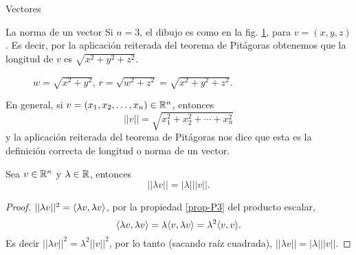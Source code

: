\begin{chapter}{Vectores}
\begin{section}{La norma de un vector}
    Si $n=3$,  el dibujo es como en la fig. \ref{fig-pitagoras-3d}, para $v =(x,y,z)$.  Es decir,  por la aplicación reiterada del teorema de Pitágoras obtenemos que la longitud de $v$ es $\sqrt{x^2 + y^2 +z^2}$.
    \begin{figure}[h]
    	\centering
        \caption{$w= \sqrt{x^2 + y^2}$, $r = \sqrt{w^2 + z^2} = \sqrt{x^2 + y^2 +z^2}$.}
        \label{fig-pitagoras-3d}
    \end{figure} 
    
    En  general,  si $v =(x_1,x_2,\ldots,x_n) \in \mathbb R^n$,  entonces
    \begin{equation*}
        ||v|| = \sqrt{x_1^2+x_2^2+\cdots+x_n^2}
    \end{equation*} 
    y la aplicación reiterada del  teorema de Pitágoras nos dice que esta es la definición correcta de longitud o norma de un vector. 
    
    \begin{proposicion}\label{prop-lambda-norma}
        Sea $v \in \mathbb R^n$ y $\lambda \in \mathbb R$,  entonces
        \begin{equation*}
            ||\lambda v|| = |\lambda|||v||.
        \end{equation*}
    \end{proposicion}
    \begin{proof}
        $||\lambda v||^2 = \langle\lambda v, \lambda v \rangle$, por la propiedad \ref{prop-P3} del producto escalar, 
        \begin{equation*}
            \langle\lambda v, \lambda v \rangle = \lambda\langle v, \lambda v \rangle = \lambda^2\langle v, v  \rangle.
        \end{equation*}
        Es decir 	$||\lambda v||^2 =  \lambda^2 ||v||^2$, por lo tanto (sacando raíz cuadrada), $||\lambda v|| = |\lambda|||v||$.
    \end{proof}
    

\end{section}
\end{chapter}

